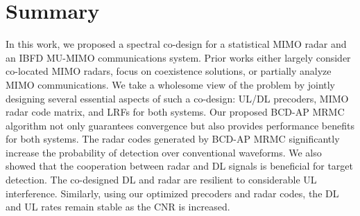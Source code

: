 \documentclass[10pt,journal]{IEEEtran}
\theoremstyle{definition}
\begin{document}
{\section{Summary}
\label{sec:conclusion}
In this work, we proposed a spectral co-design for a statistical MIMO radar and an IBFD MU-MIMO communications system. Prior works either largely consider co-located MIMO radars, focus on coexistence solutions, or partially analyze MIMO communications. We take a wholesome view of the problem by jointly designing several essential aspects of such a co-design:  UL/DL precoders, MIMO radar code matrix, and LRFs for both systems. Our proposed BCD-AP MRMC algorithm not only guarantees convergence but also provides performance benefits for both systems. %
The radar codes generated by BCD-AP MRMC significantly increase the probability of detection over conventional waveforms. We also showed that the cooperation between radar and DL signals is beneficial for target detection. The co-designed DL and radar are resilient to considerable UL interference. Similarly, using our optimized precoders and radar codes, the DL and UL rates remain stable as the CNR is increased. %
	
}
\end{document}
